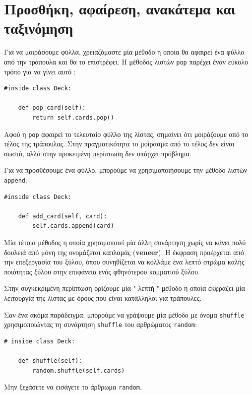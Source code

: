 \documentclass[10pt]{book}
\begin{document}
\section{Προσθήκη, αφαίρεση, ανακάτεμα και ταξινόμηση}

Για να μοιράσουμε φύλλα, χρειαζόμαστε μία μέθοδο η οποία θα αφαιρεί ένα φύλλο από την 
τράπουλα και θα το επιστρέφει.  Η μέθοδος λιστών  {\tt pop}  παρέχει έναν εύκολο 
τρόπο για να γίνει αυτό :

\begin{verbatim}
#inside class Deck:

    def pop_card(self):
        return self.cards.pop()
\end{verbatim}
%
 Αφού η  {\tt pop}  αφαιρεί το τελευταίο φύλλο της λίστας, σημαίνει ότι μοιράζουμε από το τέλος της τράπουλας.  Στην πραγματικότητα το μοίρασμα από το τέλος δεν είναι σωστό, αλλά στην προκειμένη περίπτωση δεν υπάρχει πρόβλημα.

Για να προσθέσουμε ένα φύλλο, μπορούμε να χρησιμοποιήσουμε την μέθοδο λιστών  {\tt append}:

\begin{verbatim}
#inside class Deck:

    def add_card(self, card):
        self.cards.append(card)
\end{verbatim}
%
 Μία τέτοια μέθοδος η οποία χρησιμοποιεί μία άλλη συνάρτηση χωρίς να κάνει πολύ 
δουλειά από μόνη της ονομάζεται καπλαμάς  ({\bf veneer}).   Η έκφραση προέρχεται 
από την επεξεργασία του ξύλου, όπου συνηθίζεται να κολλάμε ένα λεπτό στρώμα καλής ποιότητας ξύλου στην επιφάνεια ενός φθηνότερου κομματιού ξύλου.

Στην συγκεκριμένη περίπτωση ορίζουμε μία  " λεπτή "  μέθοδο η οποία εκφράζει 
μία λειτουργία της λίστας με όρους που είναι κατάλληλοι για τράπουλες.

Σαν ένα ακόμα παράδειγμα, μπορούμε να γράψουμε μία μέθοδο με όνομα  {\tt shuffle}  
χρησιμοποιώντας τη συνάρτηση  {\tt shuffle}  του αρθρώματος  {\tt random}:

\begin{verbatim}
# inside class Deck:

    def shuffle(self):
        random.shuffle(self.cards)
\end{verbatim}
%
 Μην ξεχάσετε να εισάγετε το άρθρωμα  {\tt random}. 
\end{document}
